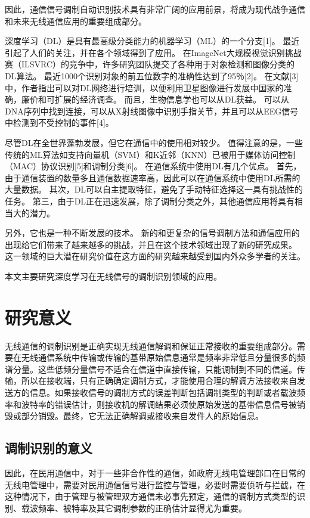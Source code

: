 因此，通信信号调制自动识别技术具有非常广阔的应用前景，将成为现代战争通信和未来无线通信应用的重要组成部分。\par

深度学习（DL）是具有最高级分类能力的机器学习（ML）的一个分支[1]。 最近引起了人们的关注，并在各个领域得到了应用。 在ImageNet大规模视觉识别挑战赛（ILSVRC）的竞争中，许多研究团队提交了各种用于对象检测和图像分类的DL算法。 最近1000个识别对象的前五位数字的准确性达到了95％[2]。 在文献[3]中，作者指出可以对DL网络进行培训，以便利用卫星图像进行发展中国家的准确，廉价和可扩展的经济调查。 而且，生物信息学也可以从DL获益。 可以从DNA序列中找到连接，可以从X射线图像中识别手指关节，并且可以从EEG信号中检测到不受控制的事件[4]。\par

尽管DL在全世界蓬勃发展，但它在通信中的使用相对较少。 值得注意的是，一些传统的ML算法如支持向量机（SVM）和K近邻（KNN）已被用于媒体访问控制（MAC）协议识别[5]和调制分类[6]。 在通信系统中使用DL有几个优点。 首先，由于通信装置的数量多且通信数据速率高，因此可以在通信系统中使用DL所需的大量数据。 其次，DL可以自主提取特征，避免了手动特征选择这一具有挑战性的任务。 第三，由于DL正在迅速发展，除了调制分类之外，其他通信应用将具有相当大的潜力。\par

另外，它也是一种不断发展的技术。 新的和更复杂的信号调制方法和通信应用的出现给它们带来了越来越多的挑战，并且在这个技术领域出现了新的研究成果。 这一领域的巨大潜在研究价值在这方面的研究越来越受到国内外众多学者的关注。\par

本文主要研究深度学习在无线信号的调制识别领域的应用。\par


\section{研究意义}

无线通信的调制识别是正确实现无线通信解调和保证正常接收的重要组成部分。需要在无线通信系统中传输或传输的基带原始信息通常是频率非常低且分量很多的频谱分量。这些低频分量信号不适合在信道中直接传输，只能调制到不同的信道。传输，所以在接收端，只有正确确定调制方式，才能使用合理的解调方法接收来自发送方的信息。如果接收信号的调制方式的误差判断包括调制类型的判断或者载波频率和波特率的错误估计，则接收机的解调结果必须使原始发送的基带信息信号被销毁或部分销毁。最终，它无法正确解调或接收来自发件人的原始信息。\par

\subsection{调制识别的意义}
因此，在民用通信中，对于一些非合作性的通信，如政府无线电管理部口在日常的无线电管理中，需要对民用通信信号进行监控与管理，必要时需要侦听与拦截，在这种情况下，由于管理与被管理双方通信未必事先预定，通信的调制方式类型的识别、载波频率、被特率及其它调制参数的正确估计显得尤为重要。\par

